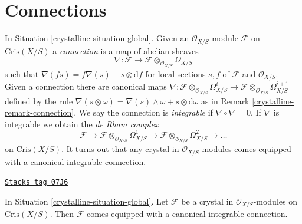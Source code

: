 \section{Connections}
\label{crystalline-section-connections}
In Situation \ref{crystalline-situation-global}.
Given an $\mathcal{O}_{X/S}$-module $\mathcal{F}$ on $\text{Cris}(X/S)$
a {\it connection} is a map of abelian sheaves
$$
\nabla :
\mathcal{F}
\longrightarrow
\mathcal{F} \otimes_{\mathcal{O}_{X/S}} \Omega_{X/S}
$$
such that $\nabla(f s) = f\nabla(s) + s \otimes \text{d}f$
for local sections $s, f$ of $\mathcal{F}$ and $\mathcal{O}_{X/S}$.
Given a connection there are canonical maps
$
\nabla :
\mathcal{F} \otimes_{\mathcal{O}_{X/S}} \Omega^i_{X/S}
\longrightarrow
\mathcal{F} \otimes_{\mathcal{O}_{X/S}} \Omega^{i + 1}_{X/S}
$
defined by the rule $\nabla(s \otimes \omega) =
\nabla(s) \wedge \omega + s \otimes \text{d}\omega$
as in Remark \ref{crystalline-remark-connection}. We say the connection is
{\it integrable} if $\nabla \circ \nabla = 0$. If $\nabla$ is integrable
we obtain the {\it de Rham complex}
$$
\mathcal{F} \to
\mathcal{F} \otimes_{\mathcal{O}_{X/S}} \Omega^1_{X/S} \to
\mathcal{F} \otimes_{\mathcal{O}_{X/S}} \Omega^2_{X/S} \to \ldots
$$
on $\text{Cris}(X/S)$. It turns out that any crystal in
$\mathcal{O}_{X/S}$-modules comes equipped with a canonical
integrable connection.

\begin{lemma}
\label{crystalline-lemma-automatic-connection}
\href{https://stacks.math.columbia.edu/tag/07J6}{\texttt{Stacks tag 07J6}}

In Situation \ref{crystalline-situation-global}.
Let $\mathcal{F}$ be a crystal in $\mathcal{O}_{X/S}$-modules
on $\text{Cris}(X/S)$. Then $\mathcal{F}$ comes equipped with a
canonical integrable connection.
\end{lemma}

